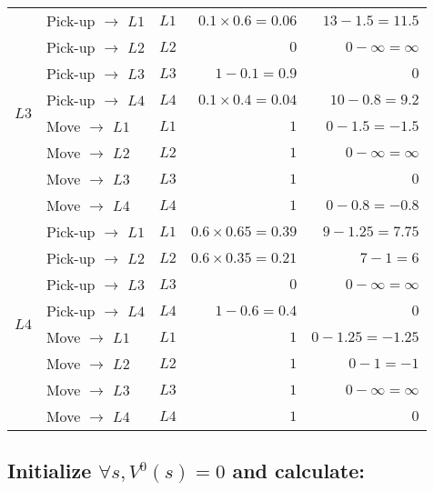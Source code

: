 \documentclass[12pt, letterpaper]{article}
\begin{document}
\begin{center}
\begin{tabular}{|c|l|c|r|r|}
    \multirow{8}{*}{$L3$}   & Pick-up $\rightarrow$ $L1$ & $L1$ & $0.1\times 0.6=0.06 $ & $13-1.5=11.5$ \\ \cline{2-5}
                            & Pick-up $\rightarrow$ $L2$ & $L2$ & $0$ & $0-\infty=\infty$ \\ \cline{2-5} 
                            & Pick-up $\rightarrow$ $L3$ & $L3$ & $1-0.1=0.9$ & $0$ \\ \cline{2-5} 
                            & Pick-up $\rightarrow$ $L4$ & $L4$ & $0.1\times 0.4=0.04$ & $10-0.8=9.2$ \\ \cline{2-5}
                            & Move $\rightarrow$ $L1$ & $L1$ & $1$ & $0-1.5=-1.5$ \\ \cline{2-5}
                            & Move $\rightarrow$ $L2$ & $L2$ & $1$ & $0-\infty=\infty$ \\ \cline{2-5}
                            & Move $\rightarrow$ $L3$ & $L3$ & $1$ & $0$ \\ \cline{2-5}
                            & Move $\rightarrow$ $L4$ & $L4$ & $1$ & $0-0.8=-0.8$ \\ \cline{2-5}
    \hline
    \multirow{8}{*}{$L4$}   & Pick-up $\rightarrow$ $L1$ & $L1$ & $0.6\times 0.65=0.39 $ & $9-1.25=7.75$ \\ \cline{2-5}
                            & Pick-up $\rightarrow$ $L2$ & $L2$ & $ 0.6\times 0.35=0.21 $ & $7-1=6$ \\ \cline{2-5} 
                            & Pick-up $\rightarrow$ $L3$ & $L3$ & $0$ & $0-\infty=\infty$ \\ \cline{2-5} 
                            & Pick-up $\rightarrow$ $L4$ & $L4$ & $1-0.6=0.4$ & $0$ \\ \cline{2-5}
                            & Move $\rightarrow$ $L1$ & $L1$ & $1$ & $0-1.25=-1.25$ \\ \cline{2-5}
                            & Move $\rightarrow$ $L2$ & $L2$ & $1$ & $0-1=-1$ \\ \cline{2-5}
                            & Move $\rightarrow$ $L3$ & $L3$ & $1$ & $0-\infty=\infty$ \\ \cline{2-5}
                            & Move $\rightarrow$ $L4$ & $L4$ & $1$ & $0$ \\ \cline{2-5}
    \hline
    \end{tabular}
\end{center}

\subsection{Initialize $\forall s,V^0(s)=0$ and calculate:}
\end{document}
